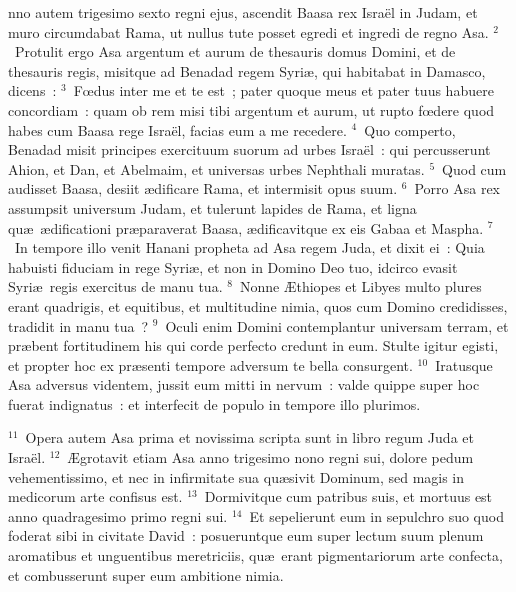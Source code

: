 \bchapter
{}nno autem trigesimo sexto regni ejus, ascendit Baasa rex Isra\"el in Judam, et muro circumdabat Rama, ut nullus tute posset egredi et ingredi de regno Asa.
${}^{2}$~Protulit ergo Asa argentum et aurum de thesauris domus Domini, et de thesauris regis, misitque ad Benadad regem Syri\ae , qui habitabat in Damasco, dicens~:
${}^{3}$~Fœdus inter me et te est~; pater quoque meus et pater tuus habuere concordiam~: quam ob rem misi tibi argentum et aurum, ut rupto fœdere quod habes cum Baasa rege Isra\"el, facias eum a me recedere.
${}^{4}$~Quo comperto, Benadad misit principes exercituum suorum ad urbes Isra\"el~: qui percusserunt Ahion, et Dan, et Abelmaim, et universas urbes Nephthali muratas.
${}^{5}$~Quod cum audisset Baasa, desiit \ae dificare Rama, et intermisit opus suum.
${}^{6}$~Porro Asa rex assumpsit universum Judam, et tulerunt lapides de Rama, et ligna qu\ae\ \ae dificationi pr\ae paraverat Baasa, \ae dificavitque ex eis Gabaa et Maspha.
${}^{7}$~In tempore illo venit Hanani propheta ad Asa regem Juda, et dixit ei~: Quia habuisti fiduciam in rege Syri\ae , et non in Domino Deo tuo, idcirco evasit Syri\ae\ regis exercitus de manu tua.
${}^{8}$~Nonne \AE thiopes et Libyes multo plures erant quadrigis, et equitibus, et multitudine nimia, quos cum Domino credidisses, tradidit in manu tua~?
${}^{9}$~Oculi enim Domini contemplantur universam terram, et pr\ae bent fortitudinem his qui corde perfecto credunt in eum. Stulte igitur egisti, et propter hoc ex pr\ae senti tempore adversum te bella consurgent.
${}^{10}$~Iratusque Asa adversus videntem, jussit eum mitti in nervum~: valde quippe super hoc fuerat indignatus~: et interfecit de populo in tempore illo plurimos.


${}^{11}$~Opera autem Asa prima et novissima scripta sunt in libro regum Juda et Isra\"el.
${}^{12}$~\AE grotavit etiam Asa anno trigesimo nono regni sui, dolore pedum vehementissimo, et nec in infirmitate sua qu\ae sivit Dominum, sed magis in medicorum arte confisus est.
${}^{13}$~Dormivitque cum patribus suis, et mortuus est anno quadragesimo primo regni sui.
${}^{14}$~Et sepelierunt eum in sepulchro suo quod foderat sibi in civitate David~: posueruntque eum super lectum suum plenum aromatibus et unguentibus meretriciis, qu\ae\ erant pigmentariorum arte confecta, et combusserunt super eum ambitione nimia.

